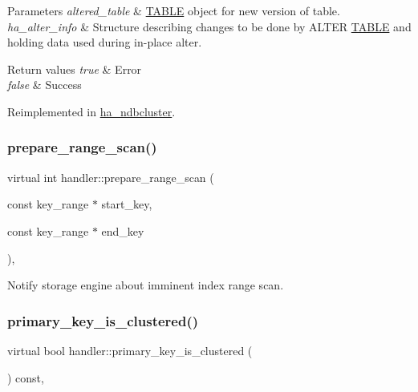 \begin{DoxyParams}{Parameters}
{\em altered\+\_\+table} & \mbox{\hyperlink{structTABLE}{T\+A\+B\+LE}} object for new version of table. \\
\hline
{\em ha\+\_\+alter\+\_\+info} & Structure describing changes to be done by A\+L\+T\+ER \mbox{\hyperlink{structTABLE}{T\+A\+B\+LE}} and holding data used during in-\/place alter.\\
\hline
\end{DoxyParams}

\begin{DoxyRetVals}{Return values}
{\em true} & Error \\
\hline
{\em false} & Success \\
\hline
\end{DoxyRetVals}


Reimplemented in \mbox{\hyperlink{classha__ndbcluster_a3d7235ae7ee13ad3a572af0fd5c15291}{ha\+\_\+ndbcluster}}.

\mbox{\label{classhandler_aa111c313513f50300e9740aeb3e4cfc4}} 
\subsubsection{\texorpdfstring{prepare\+\_\+range\+\_\+scan()}{prepare\_range\_scan()}}
{\footnotesize\ttfamily virtual int handler\+::prepare\+\_\+range\+\_\+scan (\begin{DoxyParamCaption}\item[{const key\+\_\+range $\ast$}]{start\+\_\+key,  }\item[{const key\+\_\+range $\ast$}]{end\+\_\+key }\end{DoxyParamCaption})\hspace{0.3cm}{\ttfamily [inline]}, {\ttfamily [virtual]}}

Notify storage engine about imminent index range scan. \mbox{\label{classhandler_a1c885f4b3b5bf6d2878225a188b5599f}} 
\subsubsection{\texorpdfstring{primary\+\_\+key\+\_\+is\+\_\+clustered()}{primary\_key\_is\_clustered()}}
{\footnotesize\ttfamily virtual bool handler\+::primary\+\_\+key\+\_\+is\+\_\+clustered (\begin{DoxyParamCaption}{ }\end{DoxyParamCaption}) const\hspace{0.3cm}{\ttfamily [inline]}, {\ttfamily [virtual]}}

